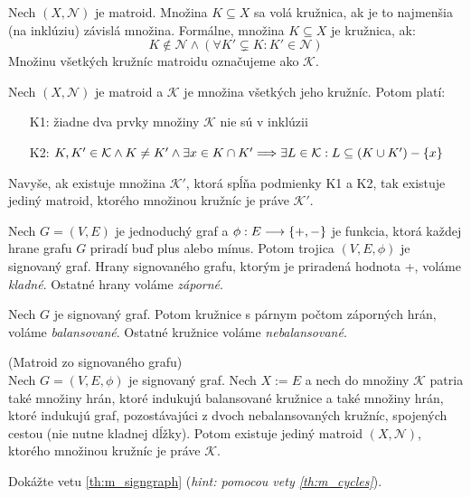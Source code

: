 \begin{definition}
Nech $(X, \mathcal{N})$ je matroid. Množina $K \subseteq X$ sa volá kružnica, ak je to najmenšia (na inklúziu) závislá množina. Formálne,
množina $K \subseteq X$ je kružnica, ak:
$$ K \not\in\mathcal{N} \wedge \left(\forall K' \subsetneq K: K' \in\mathcal{N} \right)$$ 
\noindent
Množinu všetkých kružníc matroidu označujeme ako $\mathcal{K}$.
\end{definition}

\begin{theorem}
\label{th:m_cycles}
Nech $(X, \mathcal{N})$ je matroid a $\mathcal{K}$ je množina všetkých jeho kružníc. Potom platí:
\begin{enumerate}
    \item[K1:] žiadne dva prvky množiny $\mathcal{K}$ nie sú v inklúzii
    \item[K2:] $K, K' \in \mathcal{K} \wedge K \neq K' \wedge \exists x \in K \cap K' \Longrightarrow \exists L \in \mathcal{K}: L \subseteq (K \cup K') - \left\{x\right\}$
\end{enumerate}

Navyše, ak existuje množina $\mathcal{K}'$, ktorá spĺňa podmienky K1 a K2, tak existuje jediný matroid, ktorého množinou kružníc je práve $\mathcal{K}'$.
\end{theorem}

\begin{toreview}

\begin{definition}
Nech $G = (V, E)$ je jednoduchý graf a $\phi:E\longrightarrow\left\{+, -\right\}$ je funkcia, ktorá každej hrane grafu $G$ priradí buď plus alebo mínus. 
Potom trojica $(V, E, \phi)$ je signovaný graf.
Hrany signovaného grafu, ktorým je priradená hodnota +, voláme \emph{kladné}.
Ostatné hrany voláme \emph{záporné}.
\end{definition}

\begin{definition}
Nech $G$ je signovaný graf.
Potom kružnice s párnym počtom záporných hrán, voláme \emph{balansované}. Ostatné kružnice voláme \emph{nebalansované}.
\end{definition}

\begin{theorem}{(Matroid zo signovaného grafu)}\\
\label{th:m_signgraph}
Nech $G = (V,E,\phi)$ je signovaný graf.
Nech $X := E$ a nech do množiny $\mathcal{K}$ patria také množiny hrán, ktoré indukujú balansované kružnice a také množiny hrán, ktoré indukujú graf, pozostávajúci z dvoch nebalansovaných kružníc, spojených cestou (nie nutne kladnej dĺžky).
Potom existuje jediný matroid $(X, \mathcal{N})$, ktorého množinou kružníc je práve $\mathcal{K}$. 
\end{theorem}
\begin{exercise}
Dokážte vetu \ref{th:m_signgraph} (\emph{hint: pomocou vety \ref{th:m_cycles}}).
\end{exercise}

\end{toreview}



